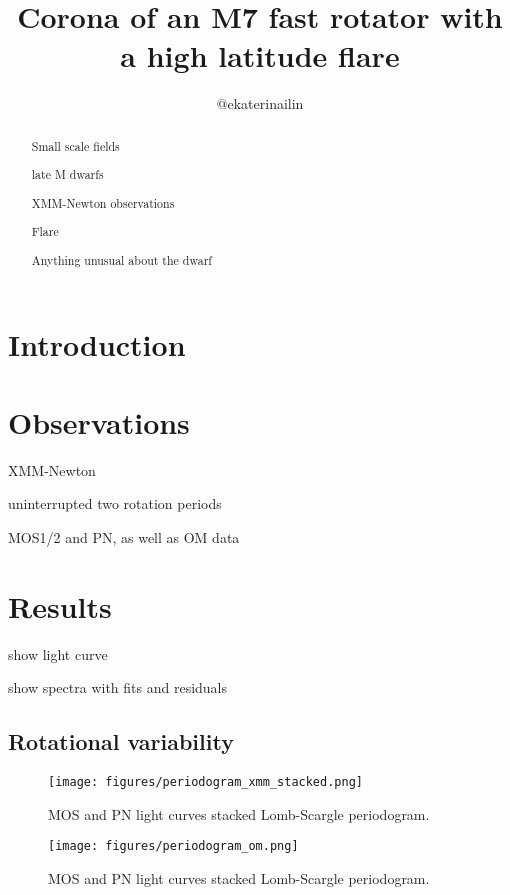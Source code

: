 \documentclass[twocolumn]{aastex631}
\begin{document}
\title{Corona of an M7 fast rotator with a high latitude flare}

\author{@ekaterinailin}

\begin{abstract}
    Small scale fields

    late M dwarfs

    XMM-Newton observations

    Flare

    Anything unusual about the dwarf
    
\end{abstract}

\section{Introduction}
\label{sec:intro}

\section{Observations}

XMM-Newton

uninterrupted two rotation periods

MOS1/2 and PN, as well as OM data

\section{Results}

show light curve

show spectra with fits and residuals

\subsection{Rotational variability}

\begin{figure*}[ht!]
    \begin{centering}
        \texttt{[image: figures/periodogram\_xmm\_stacked.png]}
        \caption{
         MOS and PN light curves stacked Lomb-Scargle periodogram.
        }
        \label{fig:coherence_hist}
    \end{centering}
\end{figure*}

\begin{figure*}[ht!]
    \begin{centering}
        \texttt{[image: figures/periodogram\_om.png]}
        \caption{
         MOS and PN light curves stacked Lomb-Scargle periodogram.
        }
        \label{fig:coherence_hist}
    \end{centering}
\end{figure*}
\end{document}
